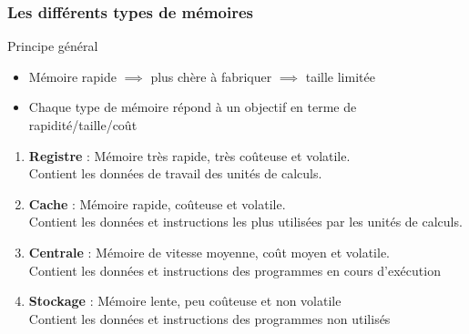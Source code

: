 \documentclass[8pt]{beamer}
\begin{document}
\begin{frame}
    \frametitle{Les différents types de mémoires}
    \begin{block}{Principe général}
        \begin{itemize}
            \item M\'emoire rapide $\implies$ plus  ch\`ere \`a
                  fabriquer $\implies$ taille  limit\'ee
            \item Chaque type de m\'emoire r\'epond \`a un objectif en
                  terme de rapidit\'e/taille/co\^ut
        \end{itemize}
    \end{block}
    \begin{enumerate}
        \item \textbf{Registre} : Mémoire très rapide, très coûteuse et
              volatile. \\
              Contient les données de travail des unités de calculs.
        \item \textbf{Cache} : Mémoire rapide, coûteuse et volatile. \\
              Contient les données et instructions les plus utilisées par les
              unités de calculs.
        \item \textbf{Centrale} : Mémoire de vitesse moyenne, coût moyen et
              volatile. \\
              Contient les données et instructions des programmes en cours
              d'exécution
        \item \textbf{Stockage} : Mémoire lente, peu coûteuse et non volatile
              \\
              Contient les données et instructions des programmes non utilisés
              \\
    \end{enumerate}

\end{frame}
\end{document}
